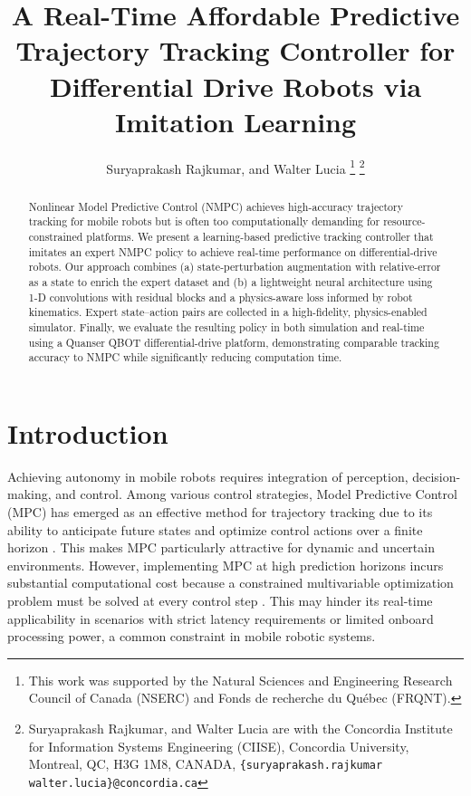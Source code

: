 \documentclass[letterpaper, 10 pt, conference]{ieeeconf}
\begin{document}
\title{A Real-Time Affordable Predictive Trajectory Tracking Controller for Differential Drive Robots via Imitation Learning}
\author{Suryaprakash Rajkumar, and Walter Lucia
\thanks{This work was supported by the Natural Sciences and Engineering Research Council of Canada (NSERC) and Fonds de recherche du Québec (FRQNT).}
\thanks{Suryaprakash Rajkumar, and Walter Lucia are with the Concordia Institute for Information Systems Engineering (CIISE), Concordia University, Montreal, QC, H3G 1M8, CANADA, {\tt\small \{suryaprakash.rajkumar walter.lucia\}@concordia.ca}}
}

\maketitle
\begin{abstract}
  Nonlinear Model Predictive Control (NMPC) achieves high-accuracy trajectory tracking for mobile robots but is often too computationally demanding for resource-constrained platforms. We present a learning-based predictive tracking controller that imitates an expert NMPC policy to achieve real-time performance on differential-drive robots. Our approach combines (a) state-perturbation augmentation with relative-error as a state to enrich the expert dataset and (b) a lightweight neural architecture using 1-D convolutions with residual blocks and a physics-aware loss informed by robot kinematics. Expert state–action pairs are collected in a high-fidelity, physics-enabled simulator. Finally, we evaluate the resulting policy in both simulation and real-time using a Quanser QBOT differential-drive platform, demonstrating comparable tracking accuracy to NMPC while significantly reducing computation time.
\end{abstract}

\section{Introduction}
Achieving autonomy in mobile robots requires integration of perception, decision-making, and control. Among various control strategies, Model Predictive Control (MPC) has emerged as an effective method for trajectory tracking due to its ability to anticipate future states and optimize control actions over a finite horizon \cite{MPC_robotica}. This makes MPC particularly attractive for dynamic and uncertain environments. However, implementing MPC at high prediction horizons incurs substantial computational cost because a constrained multivariable optimization problem must be solved at every control step \cite{mayne2014model}.  This may hinder its real-time applicability in scenarios with strict latency requirements or limited onboard processing power, a common constraint in mobile robotic systems.
\end{document}
